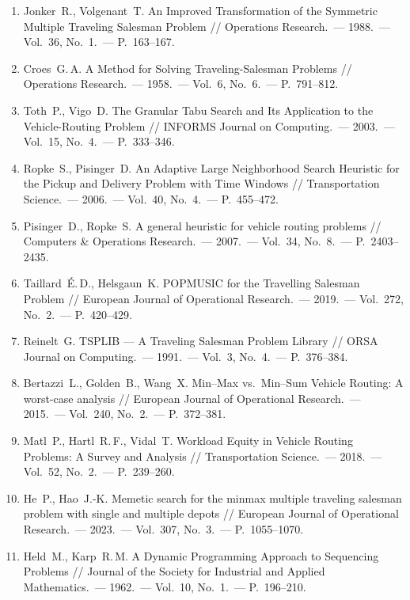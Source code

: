 \documentclass[a4paper,14pt]{extreport}
\begin{document}
\begin{enumerate}
\item Jonker~R., Volgenant~T. An Improved Transformation of the Symmetric Multiple Traveling Salesman Problem // Operations Research.~--- 1988.~--- Vol.~36, No.~1.~--- P.~163--167.

\item Croes~G.\,A. A Method for Solving Traveling-Salesman Problems // Operations Research.~--- 1958.~--- Vol.~6, No.~6.~--- P.~791--812.

\item Toth~P., Vigo~D. The Granular Tabu Search and Its Application to the Vehicle-Routing Problem // INFORMS Journal on Computing.~--- 2003.~--- Vol.~15, No.~4.~--- P.~333--346.

\item Ropke~S., Pisinger~D. An Adaptive Large Neighborhood Search Heuristic for the Pickup and Delivery Problem with Time Windows // Transportation Science.~--- 2006.~--- Vol.~40, No.~4.~--- P.~455--472.

\item Pisinger~D., Ropke~S. A general heuristic for vehicle routing problems // Computers \& Operations Research.~--- 2007.~--- Vol.~34, No.~8.~--- P.~2403--2435.

\item Taillard~É.\,D., Helsgaun~K. POPMUSIC for the Travelling Salesman Problem // European Journal of Operational Research.~--- 2019.~--- Vol.~272, No.~2.~--- P.~420--429.

\item Reinelt~G. TSPLIB --- A Traveling Salesman Problem Library // ORSA Journal on Computing.~--- 1991.~--- Vol.~3, No.~4.~--- P.~376--384.

\item Bertazzi~L., Golden~B., Wang~X. Min--Max vs.~Min--Sum Vehicle Routing: A worst-case analysis // European Journal of Operational Research.~--- 2015.~--- Vol.~240, No.~2.~--- P.~372--381.

\item Matl~P., Hartl~R.\,F., Vidal~T. Workload Equity in Vehicle Routing Problems: A Survey and Analysis // Transportation Science.~--- 2018.~--- Vol.~52, No.~2.~--- P.~239--260.

\item He~P., Hao~J.-K. Memetic search for the minmax multiple traveling salesman problem with single and multiple depots // European Journal of Operational Research.~--- 2023.~--- Vol.~307, No.~3.~--- P.~1055--1070.

\item Held~M., Karp~R.\,M. A Dynamic Programming Approach to Sequencing Problems // Journal of the Society for Industrial and Applied Mathematics.~--- 1962.~--- Vol.~10, No.~1.~--- P.~196--210.


\end{enumerate}
\end{document}
